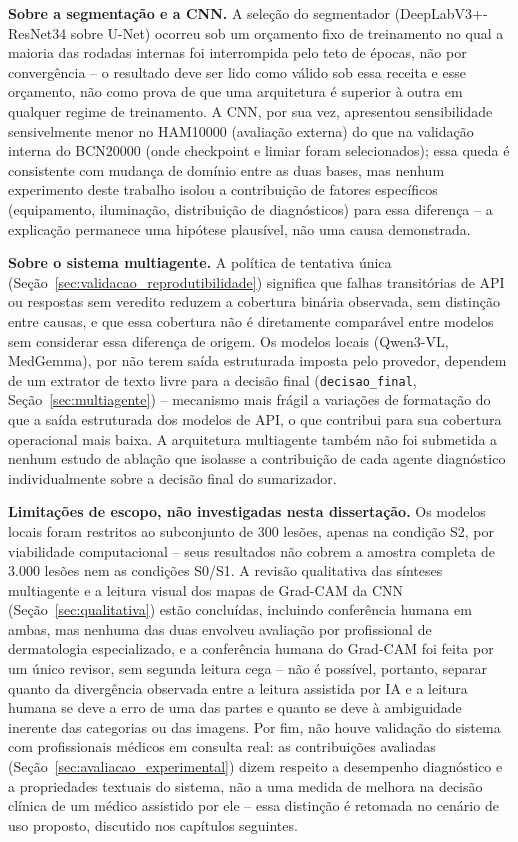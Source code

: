 \textbf{Sobre a segmentação e a CNN.} A seleção do segmentador (DeepLabV3+-ResNet34 sobre U-Net) ocorreu sob um orçamento fixo de treinamento no qual a maioria das rodadas internas foi interrompida pelo teto de épocas, não por convergência -- o resultado deve ser lido como válido sob essa receita e esse orçamento, não como prova de que uma arquitetura é superior à outra em qualquer regime de treinamento. A CNN, por sua vez, apresentou sensibilidade sensivelmente menor no HAM10000 (avaliação externa) do que na validação interna do BCN20000 (onde checkpoint e limiar foram selecionados); essa queda é consistente com mudança de domínio entre as duas bases, mas nenhum experimento deste trabalho isolou a contribuição de fatores específicos (equipamento, iluminação, distribuição de diagnósticos) para essa diferença -- a explicação permanece uma hipótese plausível, não uma causa demonstrada.

\textbf{Sobre o sistema multiagente.} A política de tentativa única (Seção~\ref{sec:validacao_reprodutibilidade}) significa que falhas transitórias de API ou respostas sem veredito reduzem a cobertura binária observada, sem distinção entre causas, e que essa cobertura não é diretamente comparável entre modelos sem considerar essa diferença de origem. Os modelos locais (Qwen3-VL, MedGemma), por não terem saída estruturada imposta pelo provedor, dependem de um extrator de texto livre para a decisão final (\texttt{decisao\_final}, Seção~\ref{sec:multiagente}) -- mecanismo mais frágil a variações de formatação do que a saída estruturada dos modelos de API, o que contribui para sua cobertura operacional mais baixa. A arquitetura multiagente também não foi submetida a nenhum estudo de ablação que isolasse a contribuição de cada agente diagnóstico individualmente sobre a decisão final do sumarizador.

\textbf{Limitações de escopo, não investigadas nesta dissertação.} Os modelos locais foram restritos ao subconjunto de 300 lesões, apenas na condição S2, por viabilidade computacional -- seus resultados não cobrem a amostra completa de 3.000 lesões nem as condições S0/S1. A revisão qualitativa das sínteses multiagente e a leitura visual dos mapas de Grad-CAM da CNN (Seção~\ref{sec:qualitativa}) estão concluídas, incluindo conferência humana em ambas, mas nenhuma das duas envolveu avaliação por profissional de dermatologia especializado, e a conferência humana do Grad-CAM foi feita por um único revisor, sem segunda leitura cega -- não é possível, portanto, separar quanto da divergência observada entre a leitura assistida por IA e a leitura humana se deve a erro de uma das partes e quanto se deve à ambiguidade inerente das categorias ou das imagens. Por fim, não houve validação do sistema com profissionais médicos em consulta real: as contribuições avaliadas (Seção~\ref{sec:avaliacao_experimental}) dizem respeito a desempenho diagnóstico e a propriedades textuais do sistema, não a uma medida de melhora na decisão clínica de um médico assistido por ele -- essa distinção é retomada no cenário de uso proposto, discutido nos capítulos seguintes.





